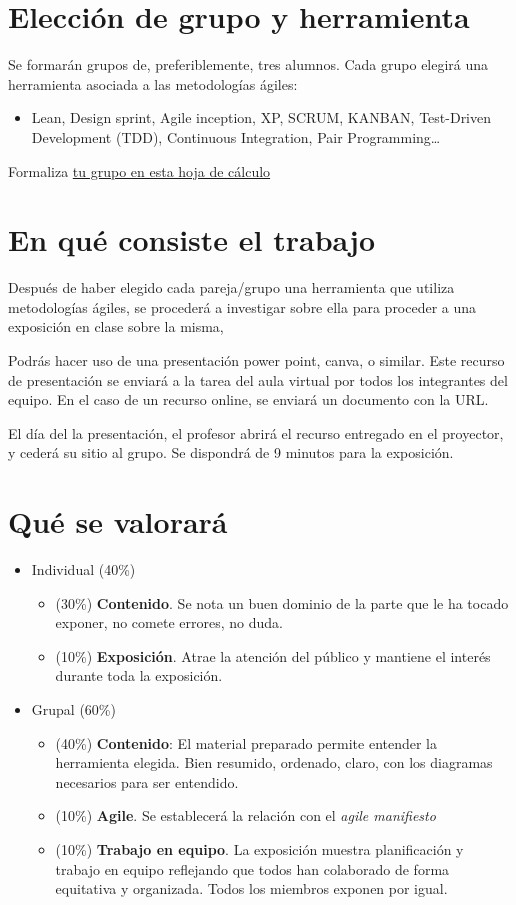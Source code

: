 \documentclass[a4paper]{article}
\begin{document}
\section{Elección de grupo y herramienta}
\label{sec:org0000003}
Se formarán grupos de, preferiblemente, tres alumnos. Cada grupo elegirá una herramienta asociada a las metodologías ágiles:
\begin{itemize}
\item Lean, Design sprint, Agile inception, XP, SCRUM, KANBAN, Test-Driven Development (TDD), Continuous Integration, Pair Programming\ldots{}
\end{itemize}

Formaliza \href{https://docs.google.com/spreadsheets/d/1-r-t4JHkw15FHfjQbuXN0CBH2zV-dWmBIPGqJIP8ZrQ/edit?gid=0\#gid=0}{tu grupo en esta hoja de cálculo}  
\section{En qué consiste el trabajo}
\label{sec:org0000006}
Después de haber elegido cada pareja/grupo una herramienta que utiliza metodologías ágiles, se procederá a investigar sobre ella para proceder a una exposición en clase sobre la misma, 

Podrás hacer uso de una presentación power point, canva, o similar. Este recurso de presentación se enviará a la tarea del aula virtual por todos los integrantes del equipo. En el caso de un recurso online, se enviará un documento con la URL.

El día del la presentación, el profesor abrirá el recurso entregado en el proyector, y cederá su sitio al grupo. Se dispondrá de 9 minutos para la exposición.
\section{Qué se valorará}
\label{sec:org0000009}

\begin{itemize}
\item Individual (40\%)
\begin{itemize}
\item (30\%) \textbf{Contenido}. Se nota un buen dominio de la parte que le ha tocado exponer, no comete errores, no duda.
\item (10\%) \textbf{Exposición}. Atrae la atención del público y mantiene el interés durante toda la exposición.
\end{itemize}

\item Grupal (60\%)
\begin{itemize}
\item (40\%) \textbf{Contenido}: El material preparado permite entender la herramienta elegida. Bien resumido, ordenado, claro, con los diagramas necesarios para ser entendido.
\item (10\%) \textbf{Agile}. Se establecerá la relación con el \emph{agile manifiesto}
\item (10\%) \textbf{Trabajo en equipo}. La exposición muestra planificación y trabajo en equipo reflejando que todos han colaborado de forma equitativa y organizada. Todos los miembros exponen por igual.
\end{itemize}
\end{itemize}
\end{document}
